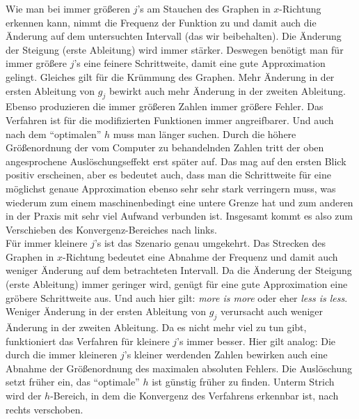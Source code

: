 \documentclass{scrartcl}
\begin{document}
Wie man bei immer größeren $j$'s am Stauchen des Graphen in $x$-Richtung erkennen kann, nimmt die Frequenz der Funktion zu und damit auch die Änderung auf dem untersuchten Intervall (das wir beibehalten). Die Änderung der Steigung (erste Ableitung) wird immer stärker. Deswegen benötigt man für immer größere $j$'s eine feinere Schrittweite, damit eine gute Approximation gelingt. Gleiches gilt für die Krümmung des Graphen. Mehr Änderung in der ersten Ableitung von $g_j$ bewirkt auch mehr Änderung in der zweiten Ableitung. Ebenso produzieren die immer größeren Zahlen immer größere Fehler. Das Verfahren ist für die modifizierten Funktionen immer angreifbarer. Und auch nach dem "`optimalen"' $h$ muss man länger suchen. Durch die höhere Größenordnung der vom Computer zu behandelnden Zahlen tritt der oben angesprochene Auslöschungseffekt erst später auf. Das mag auf den ersten Blick positiv erscheinen, aber es bedeutet auch, dass man die Schrittweite für eine möglichst genaue Approximation ebenso sehr sehr stark verringern muss, was wiederum zum einem maschinenbedingt eine untere Grenze hat und zum anderen in der Praxis mit sehr viel Aufwand verbunden ist. Insgesamt kommt es also zum Verschieben des Konvergenz-Bereiches nach links. \\
Für immer kleinere $j$'s ist das Szenario genau umgekehrt. Das Strecken des Graphen in $x$-Richtung bedeutet eine Abnahme der Frequenz und damit auch weniger Änderung auf dem betrachteten Intervall. Da die Änderung der Steigung (erste Ableitung) immer geringer wird, genügt für eine gute Approximation eine gröbere Schrittweite aus. Und auch hier gilt: \textit{more is more} oder eher \textit{less is less}. Weniger Änderung in der ersten Ableitung von $g_j$ verursacht auch weniger Änderung in der zweiten Ableitung. Da es nicht mehr viel zu tun gibt, funktioniert das Verfahren für kleinere $j$'s immer besser. Hier gilt analog: Die durch die immer kleineren $j$'s kleiner werdenden Zahlen bewirken auch eine Abnahme der Größenordnung des maximalen absoluten Fehlers. Die Auslöschung setzt früher ein, das "`optimale"' $h$ ist günstig früher zu finden. Unterm Strich wird der $h$-Bereich, in dem die Konvergenz des Verfahrens erkennbar ist, nach rechts verschoben. \\
\end{document}
